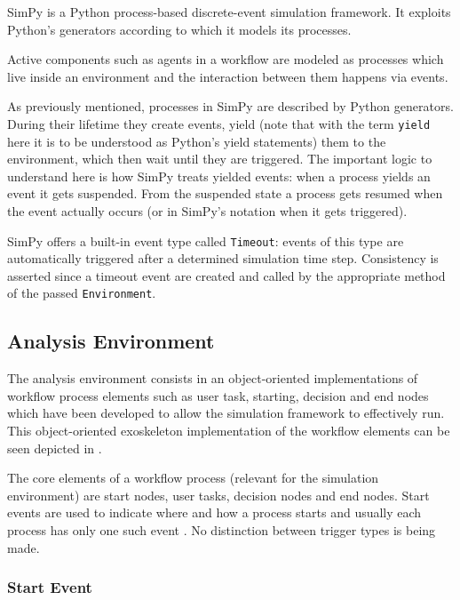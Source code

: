 \documentclass[draft=false]{seal_thesis}
\begin{document}
SimPy is a Python process-based discrete-event simulation framework. It exploits Python's generators according to which it models its processes.

Active components such as agents in a workflow are modeled as processes which live inside an environment and the interaction between them happens via events.

As previously mentioned, processes in SimPy are described by Python generators. During their lifetime they create events, yield (note that with the term \texttt{yield} here it is to be understood as Python's yield statements) them to the environment, which then wait until they are triggered. The important logic to understand here is how SimPy treats yielded events: when a process yields an event it gets suspended. From the suspended state a process gets resumed when the event actually occurs (or in SimPy's notation when it gets triggered).

SimPy offers a built-in event type called \texttt{Timeout}: events of this type are automatically triggered after a determined simulation time step. Consistency is asserted since a timeout event are created and called by the appropriate method of the passed \texttt{Environment}.

\subsection{Analysis Environment}

The analysis environment consists in an object-oriented implementations of workflow process elements such as user task, starting, decision and end nodes which have been developed to allow the simulation framework to effectively run. This object-oriented exoskeleton implementation of the workflow elements can be seen depicted in .


The core elements of a workflow process (relevant for the simulation environment) are start nodes, user tasks, decision nodes and end nodes. Start events are used to indicate where and how a process starts and usually each process has only one such event \citep[p. 42]{Silver2011}. No distinction between trigger types is being made.

\subsubsection{Start Event}
\end{document}
